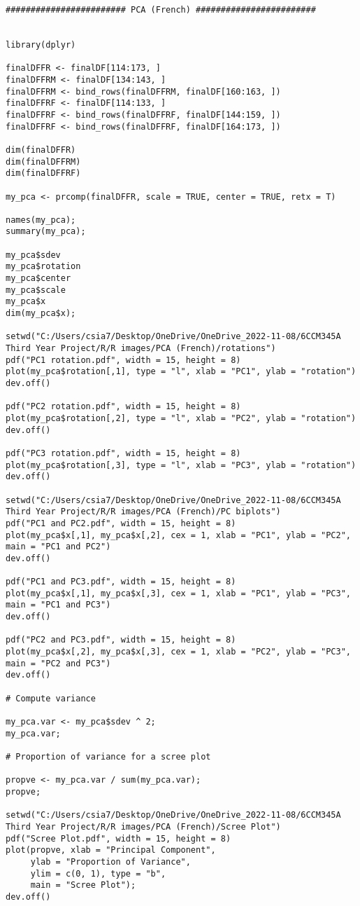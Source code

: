 \begin{verbatim}
######################## PCA (French) ########################


library(dplyr)

finalDFFR <- finalDF[114:173, ]
finalDFFRM <- finalDF[134:143, ]
finalDFFRM <- bind_rows(finalDFFRM, finalDF[160:163, ])
finalDFFRF <- finalDF[114:133, ]
finalDFFRF <- bind_rows(finalDFFRF, finalDF[144:159, ])
finalDFFRF <- bind_rows(finalDFFRF, finalDF[164:173, ])

dim(finalDFFR)
dim(finalDFFRM)
dim(finalDFFRF)

my_pca <- prcomp(finalDFFR, scale = TRUE, center = TRUE, retx = T)

names(my_pca);
summary(my_pca);

my_pca$sdev
my_pca$rotation
my_pca$center
my_pca$scale
my_pca$x
dim(my_pca$x);

setwd("C:/Users/csia7/Desktop/OneDrive/OneDrive_2022-11-08/6CCM345A Third Year Project/R/R images/PCA (French)/rotations")
pdf("PC1 rotation.pdf", width = 15, height = 8) 
plot(my_pca$rotation[,1], type = "l", xlab = "PC1", ylab = "rotation")
dev.off()

pdf("PC2 rotation.pdf", width = 15, height = 8) 
plot(my_pca$rotation[,2], type = "l", xlab = "PC2", ylab = "rotation")
dev.off()

pdf("PC3 rotation.pdf", width = 15, height = 8) 
plot(my_pca$rotation[,3], type = "l", xlab = "PC3", ylab = "rotation")
dev.off()

setwd("C:/Users/csia7/Desktop/OneDrive/OneDrive_2022-11-08/6CCM345A Third Year Project/R/R images/PCA (French)/PC biplots")
pdf("PC1 and PC2.pdf", width = 15, height = 8) 
plot(my_pca$x[,1], my_pca$x[,2], cex = 1, xlab = "PC1", ylab = "PC2", main = "PC1 and PC2")
dev.off()

pdf("PC1 and PC3.pdf", width = 15, height = 8) 
plot(my_pca$x[,1], my_pca$x[,3], cex = 1, xlab = "PC1", ylab = "PC3", main = "PC1 and PC3")
dev.off()

pdf("PC2 and PC3.pdf", width = 15, height = 8) 
plot(my_pca$x[,2], my_pca$x[,3], cex = 1, xlab = "PC2", ylab = "PC3", main = "PC2 and PC3")
dev.off()

# Compute variance

my_pca.var <- my_pca$sdev ^ 2;
my_pca.var;

# Proportion of variance for a scree plot

propve <- my_pca.var / sum(my_pca.var);
propve;

setwd("C:/Users/csia7/Desktop/OneDrive/OneDrive_2022-11-08/6CCM345A Third Year Project/R/R images/PCA (French)/Scree Plot")
pdf("Scree Plot.pdf", width = 15, height = 8) 
plot(propve, xlab = "Principal Component",
     ylab = "Proportion of Variance",
     ylim = c(0, 1), type = "b",
     main = "Scree Plot");
dev.off()


\end{verbatim}
